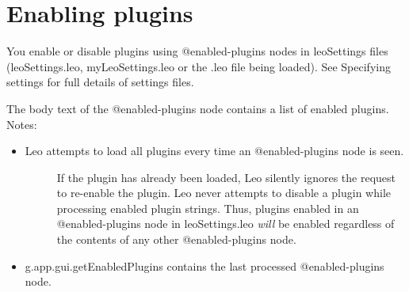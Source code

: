 \documentclass[a4paper,10pt,english]{sphinxmanual}
\begin{document}
\section{Enabling plugins}
\label{plugins:enabling-plugins}\label{plugins:creating-script-buttons}
You enable or disable plugins using @enabled-plugins nodes in leoSettings files
(leoSettings.leo, myLeoSettings.leo or the .leo file being loaded). See
Specifying settings for full details of settings files.

The body text of the @enabled-plugins node contains a list of enabled plugins.
Notes:
\begin{itemize}
\item {} \begin{description}
\item[{Leo attempts to load all plugins every time an @enabled-plugins node is seen.}] \leavevmode
If the plugin has already been loaded, Leo silently ignores the request to
re-enable the plugin. Leo never attempts to disable a plugin while processing
enabled plugin strings. Thus, plugins enabled in an @enabled-plugins node in
leoSettings.leo \emph{will} be enabled regardless of the contents of any other
@enabled-plugins node.

\end{description}

\item {} 
g.app.gui.getEnabledPlugins contains the last processed @enabled-plugins node.

\end{itemize}
\end{document}
